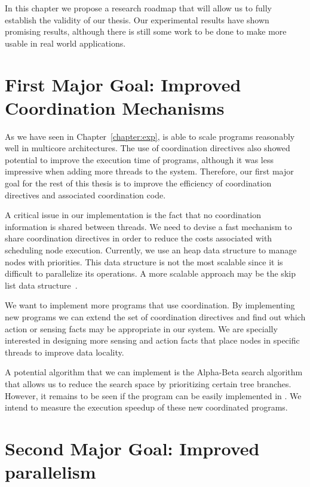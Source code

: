 
In this chapter we propose a research roadmap that will allow us to fully establish the validity of our thesis.
Our experimental results have shown promising results, although there is still some work to be done to make
\lang more usable in real world applications.

\section{First Major Goal: Improved Coordination Mechanisms}

As we have seen in Chapter~\ref{chapter:exp}, \lang is able to scale programs reasonably well
in multicore architectures.
The use of coordination directives also showed potential to improve the execution time of programs, although it was less impressive
when adding more threads to the system. Therefore, our first major goal for the rest of this thesis is to improve the
efficiency of coordination directives and associated coordination code.

A critical issue in our implementation is the fact that no coordination information is shared between threads. We need to devise a fast mechanism to share coordination directives
in order to reduce the costs associated with scheduling node execution.
Currently, we use an heap data structure to manage nodes with priorities. This data structure is not the most scalable since it is difficult to parallelize its operations.
A more scalable approach may be the skip list data structure~\cite{Sundell:2005:FLC:1073765.1073770}.

We want to implement more programs that use coordination. By implementing new programs we can
extend the set of coordination directives and find out which action or sensing facts may be
appropriate in our system. We are specially interested in designing more sensing and action
facts that place nodes in specific threads to improve data locality.

A potential algorithm that we can implement is the Alpha-Beta search algorithm
that allows us to reduce the search space by prioritizing certain tree branches. However, it remains to be
seen if the program can be easily implemented in \lang.
We intend to measure the execution speedup of these new coordinated programs.

\section{Second Major Goal: Improved parallelism}


